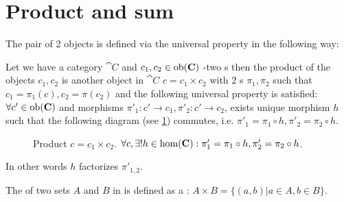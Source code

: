 \section{Product and sum}
The pair of 2 objects is defined via the universal property in
the following way:
\begin{definition}[Product]
\label{def:product}
Let we have a category $\cat{C}$ and $c_1, c_2 \in \mathrm{ob}(\mathbf{C})$ -two
s then the product of the objects $c_1, c_2$ is
another object in $\cat{C}$ $c = c_1 \times c_2$ with 2
s $\pi_1, \pi_2$ such that $c_1 = \pi_1(c),
c_2 = \pi(c_2)$ and the  
following universal property is satisfied: $\forall c' \in \mathrm{ob}(\mathbf{C})$
and morphisms $\pi'_1: c' \to c_1, \pi'_2: c' \to c_2$, exists unique
morphism $h$ such that the following diagram (see \cref{fig:product})
commutes, i.e. $\pi'_1 = \pi_1 \circ h, \pi'_2 = \pi_2 \circ h$.
\begin{figure}
  \centering
  \caption{Product $c = c_1 \times c_2$. $\forall c, \exists! h \in
    \mathrm{hom}(\mathbf{C}): \pi'_1 = \pi_1 \circ h, \pi'_2 = \pi_2 \circ h$.}
  \label{fig:product}
\end{figure}
In other words $h$ factorizes $\pi'_{1,2}$.
\end{definition}

\begin{example}
\label{ex:set_product}
The  of two sets $A$ and $B$ in
 is defined 
as a : $A \times B = \{(a,b)| a \in A, b \in B\}$. 
\end{example}

